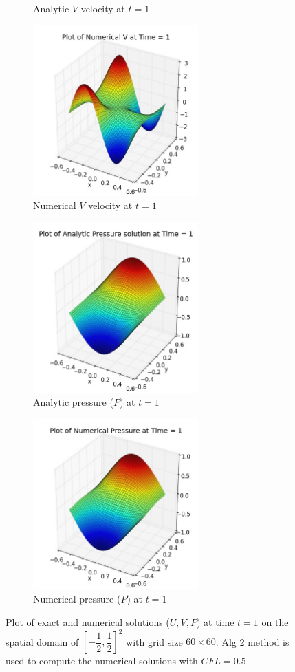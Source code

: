 \begin{figure}[H]
\begin{subfigure}[t]{2.5in}
		\caption{Analytic $V$ velocity at $t=1$}\label{fig:6.7c}
	\end{subfigure}
	\quad
	\begin{subfigure}[t]{2.5in}
		\centering
		\includegraphics[width=2.5in]{figures/Pm1b_pf2b_vf_t_1_grid_60.jpg}
		\caption{Numerical $V$ velocity at $t=1$}\label{fig:6.7d}
	\end{subfigure}
	\quad	
	\begin{subfigure}[t]{2.5in}
		\centering
		\includegraphics[width=2.5in]{figures/Pm1b_pf2b_P_exact_t_1_grid_60.jpg}
		\caption{Analytic pressure ($P$) at $t=1$}\label{fig:6.7e}
	\end{subfigure}
	\quad	
	\begin{subfigure}[t]{2.5in}
		\centering
		\includegraphics[width=2.5in]{figures/Pm1b_pf2b_pf_t_1_grid_60.jpg}
		\caption{Numerical pressure ($P$) at $t=1$}\label{fig:6.7f}
	\end{subfigure}
	\caption{Plot of exact and numerical solutions ($U,V,P$) at time $t=1$ on the spatial domain of $[-\dfrac{1}{2},\dfrac{1}{2}]^2$ with grid size $60 \times 60$. Alg 2 method is used to compute the numerical solutions with $CFL=0.5$}\label{fig:6.7}
\end{figure}

